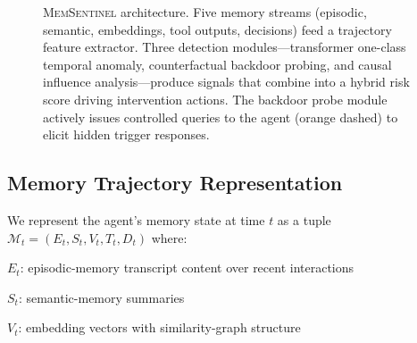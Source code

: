 \documentclass[sigconf,nonacm]{acmart}
\begin{document}
\begin{figure}[t]
\caption{\textsc{MemSentinel} architecture. Five memory streams
  (episodic, semantic, embeddings, tool outputs, decisions) feed a
  trajectory feature extractor. Three detection modules---transformer
  one-class temporal anomaly, counterfactual backdoor probing, and
  causal influence analysis---produce signals that combine into a
  hybrid risk score driving intervention actions. The backdoor probe
  module actively issues controlled queries to the agent (orange
  dashed) to elicit hidden trigger responses.}
\label{fig:framework}
\end{figure}

\subsection{Memory Trajectory Representation}

We represent the agent's memory state at time $t$ as a tuple
$\mathcal{M}_t = (E_t, S_t, V_t, T_t, D_t)$ where:

\textbf{$E_t$}: episodic-memory transcript content over recent
interactions

\textbf{$S_t$}: semantic-memory summaries

\textbf{$V_t$}: embedding vectors with similarity-graph structure
\end{document}
